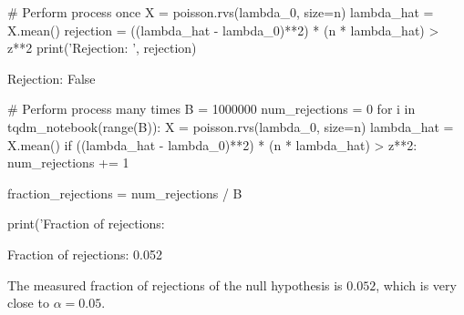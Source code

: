 \begin{python}
# Perform process once
X = poisson.rvs(lambda_0, size=n)
lambda_hat = X.mean()
rejection = ((lambda_hat - lambda_0)**2) * (n * lambda_hat) > z**2
print('Rejection: ', rejection)
\end{python}

\begin{console}
Rejection:  False
\end{console}

\begin{python}
# Perform process many times
B = 1000000
num_rejections = 0
for i in tqdm_notebook(range(B)):
    X = poisson.rvs(lambda_0, size=n)
    lambda_hat = X.mean()
    if ((lambda_hat - lambda_0)**2) * (n * lambda_hat) > z**2:
        num_rejections += 1
        
fraction_rejections = num_rejections / B

print('Fraction of rejections: %
\end{python}

\begin{console}
Fraction of rejections: 0.052
\end{console}

The measured fraction of rejections of the null hypothesis is \(0.052\),
which is very close to \(\alpha = 0.05\).
